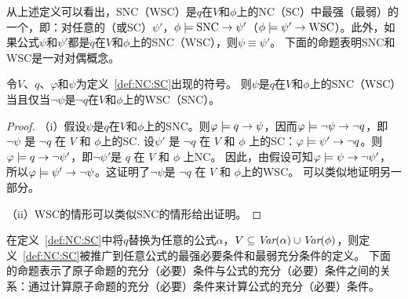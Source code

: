 从上述定义可以看出，SNC（WSC）是$q$在$V$和$\phi$上的NC（SC）中最强（最弱）的一个，即：对任意的（或SC）$\psi'$，$\phi \models \hbox{SNC} \rightarrow \psi'$（$\phi \models \psi' \rightarrow \hbox{WSC}$）。此外，如果公式$\psi$和$\psi'$都是$q$在$V$和$\phi$上的SNC（WSC），则$\psi \equiv \psi'$。
下面的命题表明SNC和WSC是一对对偶概念。

\begin{proposition}[对偶性]\label{dual}
	令$V$、$q$、$\varphi$和$\psi$为定义~\ref{def:NC:SC}出现的符号。
	则$\psi$是$q$在$V$和$\phi$上的SNC（WSC）当且仅当$\neg \psi$是$\neg q$在$V$和$\phi$上的WSC（SNC）。
\end{proposition}
\begin{proof}
	（i）假设$\psi$是$q$在$V$和$\phi$上的SNC。则$\varphi \models q \rightarrow \psi$，因而$\varphi \models \neg \psi \rightarrow \neg q$，即 $\neg \psi$ 是 $\neg q$ 在 $V$ 和 $\phi$上的SC. 设$\psi'$ 是 $\neg q$ 在 $V$ 和 $\phi$ 上的SC：$\varphi \models \psi' \rightarrow \neg q$。则$\varphi \models q \rightarrow \neg \psi'$，即$\neg \psi'$是 $q$ 在 $V$ 和 $\phi$ 上NC。
	因此，由假设可知$\varphi \models \psi \rightarrow \neg \psi'$，所以$\varphi \models \psi' \rightarrow \neg \psi$。这证明了$\neg \psi$是 $\neg q$ 在 $V$ 和 $\phi$上的WSC。
可以类似地证明另一部分。
	
	（ii）WSC的情形可以类似SNC的情形给出证明。
\end{proof}

在定义~\ref{def:NC:SC}中将$q$替换为任意的公式$\alpha$，$V\subseteq \textit{Var}(\alpha) \cup \textit{Var}(\phi)$，则定义~\ref{def:NC:SC}被推广到任意公式的最强必要条件和最弱充分条件的定义。
下面的命题表示了原子命题的充分（必要）条件与公式的充分（必要）条件之间的关系：通过计算原子命题的充分（必要）条件来计算公式的充分（必要）条件。



